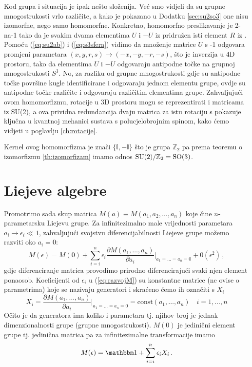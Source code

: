 Kod grupa  i  situacija je ipak nešto složenija. Već smo vidjeli
da su grupne mnogostrukosti vrlo različite, a kako je
pokazano u Dodatku \ref{sec:su2so3} one
nisu izomorfne, nego samo homomorfne.
Konkretno, homomorfno preslikavanje je 2-na-1 tako da je svakim dvama elementima 
$U$ i $-U$ iz  pridružen isti element $R$ iz .
Pomoću (\ref{eq:su2ab}) i (\ref{eq:s3sfera}) vidimo da množenje matrice $U$
s -1 odgovara promjeni parametara $(x, y, r, s) \to (-x, -y, -r, -s)$,
što je inverzija u 4D prostoru, tako da elementima $U$ i $-U$ odgovaraju
antipodne točke na grupnoj mnogostrukosti $S^3$. No, za razliku od
grupne mnogostrukosti  gdje su antipodne točke površine kugle
identificirane i odgovaraju jednom elementu grupe, ovdje su antipodne
točke različite i odgovaraju različitim elementima grupe.
Zahvaljujući ovom homomorfizmu, rotacije u 3D prostoru mogu se reprezentirati
i matricama iz SU(2), a ova prividna redundancija dvaju matrica za
istu rotaciju s pokazuje ključna u kvantnoj mehanici sustava s polucjelobrojnim
spinom, kako ćemo vidjeti u poglavlju \ref{ch:rotacije}.

Kernel ovog homomorfizma je znači $\{\mathbb{I}, -\mathbb{I}\}$ što je
grupa $\mathbb{Z}_2$ pa prema
teoremu o izomorfizmu \ref{th:izomorfizam} imamo
odnos $\mathrm{SU}(2)/\mathbb{Z}_2 = \mathrm{SO}(3)$.





\section{Liejeve algebre}
\label{sec:liejevealgebre}

Promotrimo sada skup matrica $M(a)\equiv M(a_1, a_2, \ldots, a_n)$ koje
čine $n$-pa\-ra\-me\-tar\-sku Liejevu grupe.
Za infinitezimalno male vrijednosti parametara $a_i \to \epsilon_i \ll 1$, zahvaljujući
svojstvu diferencijabilnosti Liejeve grupe možemo razviti oko $a_i = 0$:
\begin{equation}
   M(\epsilon)=M(0)+ \sum_{i=i}^{n}\epsilon_i \frac{\partial M(a_1, \ldots, a_n)}
 {\partial a_i}\Bigg|_{a_1=\ldots =a_n=0} + 0(\epsilon^2) \,,
 \label{eq:razvojM}
\end{equation}
gdje diferenciranje matrica provodimo prirodno diferencirajući svaki njen
element ponaosob. Koeficijenti od $\epsilon_i$ u (\ref{eq:razvojM}) su
konstantne matrice (ne ovise o parametrima) koje se nazivaju generatori
i skraćeno ćemo ih označiti s $X_i$
\begin{equation}
X_i =  \frac{\partial M(a_1, \ldots, a_n)}
 {\partial a_i}\Bigg|_{a_1=\ldots =a_n=0} = \textrm{const}(a_1, \ldots, a_n)
   \quad i=1, \ldots, n 
   \label{eq:defXi}
\end{equation}
Očito je da generatora ima koliko i parametara tj. njihov broj je jednak
dimenzionalnosti grupe (grupne mnogostrukosti).  $M(0)$ je jedinični
element grupe tj. jedinična matrica pa za infinitezimalne transformacije imamo
\begin{equation}
  M(\epsilon)=\Eins + \sum_{i=i}^{n}\epsilon_i X_i \,. 
\end{equation}

